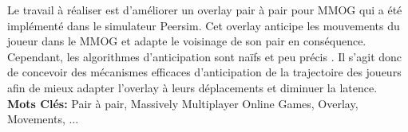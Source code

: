 		Le travail à réaliser est d'améliorer un overlay pair à pair pour MMOG qui a été implémenté dans le simulateur Peersim. Cet overlay anticipe les mouvements du joueur dans le MMOG et adapte le voisinage de son pair en conséquence. Cependant, les algorithmes d’anticipation sont naïfs et peu précis .
Il s’agit donc de concevoir des mécanismes efficaces d’anticipation de la trajectoire des joueurs afin de mieux adapter l’overlay à leurs déplacements et diminuer la latence.\\

\textbf{Mots Clés:} Pair à pair, Massively Multiplayer Online Games, Overlay, Movements, ...
